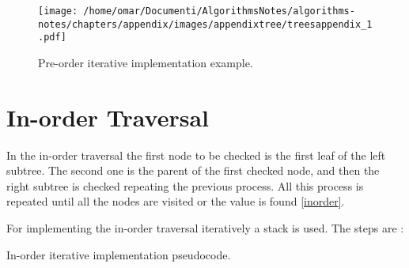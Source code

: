 \begin{figure}[H]
	\begin{center}
		\texttt{[image: /home/omar/Documenti/AlgorithmsNotes/algorithms-notes/chapters/appendix/images/appendixtree/treesappendix\_1.pdf]}
		\caption[Pre-order iterative implementation example.]{Pre-order iterative implementation example.}
		\label{appendixtrees_1}
	\end{center}
\end{figure}

\section{In-order Traversal}
\label{inorderappendix}
In the in-order traversal the first node to be checked is the first leaf of the left subtree. The second one is the parent of the first checked node, and then the right subtree is checked repeating the previous process. All this process is repeated until all the nodes are visited or the value is found \ref{inorder}. 

For implementing the in-order traversal iteratively a stack is used. The steps are \cite{wikitreestrav}:

\begin{algorithm}[H]
	\DontPrintSemicolon
	\LinesNumbered
  	\;
\caption{In-order iterative implementation pseudocode.}
\end{algorithm}

